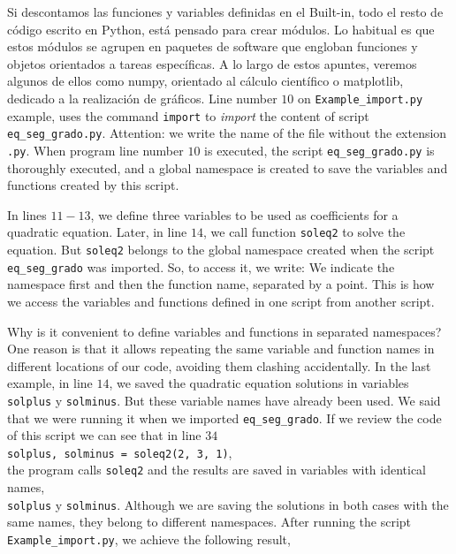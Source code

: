 \begin{paracol}{2}
Si descontamos las funciones y variables definidas en el Built-in, todo el resto de código escrito en Python, está pensado para crear módulos. Lo habitual es que estos módulos se agrupen en paquetes de software que engloban funciones y objetos orientados a tareas específicas. A lo largo de estos apuntes, veremos algunos de ellos como numpy, orientado al cálculo científico o matplotlib, dedicado a la realización de gráficos.
\switchcolumn
Line number $10$ on \texttt{Example_import.py} example, uses the command \texttt{import} to \emph{import} the content of script \texttt{eq_seg_grado.py}. Attention: we write the name of the file without the extension \texttt{.py}. When program line number $10$ is executed, the script \texttt{eq_seg_grado.py} is thoroughly executed, and a global namespace is created to save the variables and functions created by this script.

In lines $11 - 13$, we define three variables to be used as coefficients for a quadratic equation. Later, in line $14$, we call function \texttt{soleq2} to solve the equation. But \texttt{soleq2} belongs to the global namespace created when the script \texttt{eq_seg_grado} was imported. So, to access it, we write:
We indicate the namespace first and then the function name, separated by a point. This is how we access the variables and functions defined in one script from another script. 

Why is it convenient to define variables and functions in separated namespaces? One reason is that it allows repeating the same variable and function names in different locations of our code, avoiding them clashing accidentally. In the last example, in line $14$, we saved the quadratic equation solutions in variables \texttt{solplus} y \texttt{solminus}. But these variable names have already been used. We said that we were running it when we imported \texttt{eq_seg_grado}. If we review the code of this script we can see that in line $34$\\ \texttt{solplus, solminus = soleq2(2, 3, 1)},\\ the program calls \texttt{soleq2} and the results are saved in variables with identical names,\\ \texttt{solplus} y \texttt{solminus}. Although we are saving the solutions in both cases with the same names, they belong to different namespaces. After running the script \texttt{Example_import.py}, we achieve the following result,   


\end{paracol}
